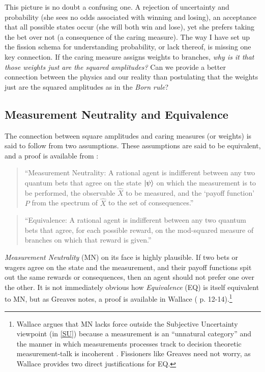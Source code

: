 \documentclass{article}
\begin{document}
This picture is no doubt a confusing one. A rejection of uncertainty and probability (she sees no odds associated with winning and losing), an acceptance that all possible states occur (she will both win and lose), yet she prefers taking the bet over not (a consequence of the caring measure). The way I have set up the fission schema for understanding probability, or lack thereof, is missing one key connection. If the caring measure assigns weights to branches, \emph{why is it that those weights just are the squared amplitudes?} Can we provide a better connection between the physics and our reality than postulating that the weights just are the squared amplitudes as in the \emph{Born rule}?

\subsection{Measurement Neutrality and Equivalence}

The connection between square amplitudes and caring measures (or weights) is said to follow from two assumptions. These assumptions are said to be equivalent, and a proof is available from  \parencite[10]{greavesProbabilityEverettInterpretation2007}:

\begin{quote}
	``Measurement Neutrality:  A rational agent is indifferent between any two quantum bets that agree on the state $\ket{\psi}$  on which the measurement is to be performed, the observable $\hat{X}$ to be measured, and the  `payoff function' $P$ from the spectrum of $\hat{X}$ to the set of consequences.''
\end{quote}

\begin{quote}
	``Equivalence:  A rational agent is indifferent between any two quantum bets that agree, for each possible reward, on the mod-squared measure of branches on which that reward is given.''
\end{quote}

\emph{Measurement Neutrality} (MN) on its face is highly plausible. If two bets or wagers agree on the state and the measurement, and their payoff functions spit out the same rewards or consequences, then an agent should not prefer one over the other. It is not immediately obvious how \emph{Equivalence} (EQ) is itself equivalent to MN, but as Greaves notes, a proof is available in Wallace (\citeyear{wallaceQuantumProbabilitySubjective2005} p. 12-14).\footnote{Wallace argues that MN lacks force outside the Subjective Uncertainty viewpoint (in \textsection \ref{SU}) because a measurement is an ``unnatural category'' and the manner in which measurements processes track to decision theoretic measurement-talk is incoherent \parencite{wallaceEpistemologyQuantizedCircumstances2006}. Fissioners like Greaves need not worry, as Wallace provides two direct justifications for EQ. }
\end{document}
